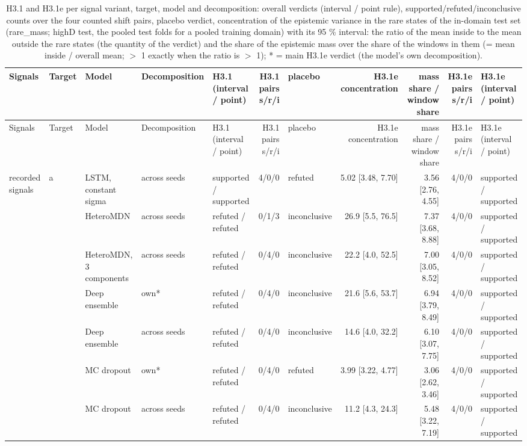 \begin{longtable}{lllllrlrrrl}
\caption{H3.1 and H3.1e per signal variant, target, model and decomposition: overall verdicts (interval / point rule), supported/refuted/inconclusive counts over the four counted shift pairs, placebo verdict, concentration of the epistemic variance in the rare states of the in-domain test set (rare\_mass; highD test, the pooled test folds for a pooled training domain) with its 95 \% interval: the ratio of the mean inside to the mean outside the rare states (the quantity of the verdict) and the share of the epistemic mass over the share of the windows in them (= mean inside / overall mean; $>$ 1 exactly when the ratio is $>$ 1); * = main H3.1e verdict (the model's own decomposition).}\label{tab:t2-h31-summary} \\
\toprule
Signals & Target & Model & Decomposition & H3.1 (interval / point) & H3.1 pairs s/r/i & placebo & H3.1e concentration & mass share / window share & H3.1e pairs s/r/i & H3.1e (interval / point) \\
\midrule
\endfirsthead
\toprule
Signals & Target & Model & Decomposition & H3.1 (interval / point) & H3.1 pairs s/r/i & placebo & H3.1e concentration & mass share / window share & H3.1e pairs s/r/i & H3.1e (interval / point) \\
\midrule
\endhead
\bottomrule
\endlastfoot
recorded signals & a & LSTM, constant sigma & across seeds & supported / supported & 4/0/0 & refuted & 5.02 [3.48, 7.70] & 3.56 [2.76, 4.55] & 4/0/0 & supported / supported \\
 &  & HeteroMDN & across seeds & refuted / refuted & 0/1/3 & inconclusive & 26.9 [5.5, 76.5] & 7.37 [3.68, 8.88] & 4/0/0 & supported / supported \\
 &  & HeteroMDN, 3 components & across seeds & refuted / refuted & 0/4/0 & inconclusive & 22.2 [4.0, 52.5] & 7.00 [3.05, 8.52] & 4/0/0 & supported / supported \\
 &  & Deep ensemble & own* & refuted / refuted & 0/4/0 & inconclusive & 21.6 [5.6, 53.7] & 6.94 [3.79, 8.49] & 4/0/0 & supported / supported \\
 &  & Deep ensemble & across seeds & refuted / refuted & 0/4/0 & inconclusive & 14.6 [4.0, 32.2] & 6.10 [3.07, 7.75] & 4/0/0 & supported / supported \\
 &  & MC dropout & own* & refuted / refuted & 0/4/0 & refuted & 3.99 [3.22, 4.77] & 3.06 [2.62, 3.46] & 4/0/0 & supported / supported \\
 &  & MC dropout & across seeds & refuted / refuted & 0/4/0 & inconclusive & 11.2 [4.3, 24.3] & 5.48 [3.22, 7.19] & 4/0/0 & supported / supported \\

\end{longtable}
